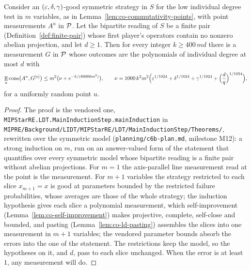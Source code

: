 \begin{lemma}
\label{lem:co-main-induction}
\leanok
Consider an $(\eps, \delta, \gamma)$-good symmetric strategy in $S$ for the low individual degree
test in $m$ variables, as in Lemma~\ref{lem:co-commutativity-points}, with point measurements
$A^u$ in $\cal{P}$. Let the bipartite reading of $S$ be a finite pair
(Definition~\ref{def:finite-pair}) whose first player's operators contain no nonzero abelian
projection, and let $d \geq 1$. Then for every integer $k \geq 400\, m d$ there is a measurement
$G$ in $\cal{P}$ whose outcomes are the polynomials of individual degree at most $d$ with
\[
  \E_u \mathrm{cons}\bigl(A^u, G^{[u]}\bigr) \leq m^2 \bigl(\nu + e^{-k / (80000 m^2)}\bigr),
  \qquad \nu = 1000\, k^2 m^2 \Bigl(\eps^{1/1024} + \delta^{1/1024} + \gamma^{1/1024} +
  \Bigl(\frac{d}{q}\Bigr)^{1/1024}\Bigr),
\]
for a uniformly random point $u$.
\end{lemma}

\begin{proof}
\leanok
The proof is the vendored one, \texttt{MIPStarRE.LDT.MainInductionStep.mainInduction} in
\texttt{MIPRE/Background/LIDT/MIPStarRE/LDT/MainInductionStep/Theorems/}, rewritten over the
symmetric model (\texttt{planning/c6b-plan.md}, milestone M12): a strong induction on $m$, run on
an answer-valued form of the statement that quantifies over every symmetric model whose bipartite
reading is a finite pair without abelian projections. For $m = 1$ the axis-parallel line
measurement read at the point is the measurement. For $m + 1$ variables the strategy restricted to
each slice $x_{m+1} = x$ is good at parameters bounded by the restricted failure probabilities,
whose averages are those of the whole strategy; the induction hypothesis gives each slice a
polynomial measurement, which self-improvement (Lemma~\ref{lem:co-self-improvement}) makes
projective, complete, self-close and bounded, and pasting
(Lemma~\ref{lem:co-ld-pasting}) assembles the slices into one measurement in $m + 1$ variables;
the vendored parameter bounds absorb the errors into the one of the statement. The restrictions
keep the model, so the hypotheses on it, and $d$, pass to each slice unchanged. When the error is
at least $1$, any measurement will do.
\end{proof}

